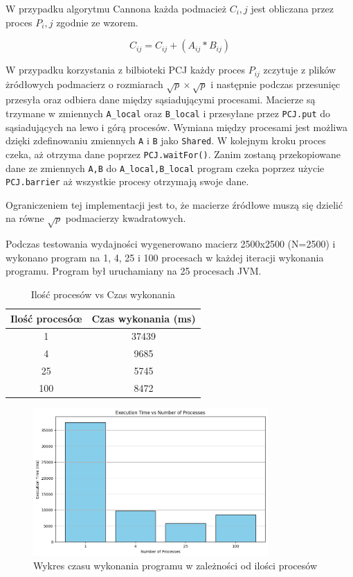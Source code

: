 \documentclass[11pt]{article}
\begin{document}
    W przypadku algorytmu Cannona każda podmacież $C_i,j$ jest obliczana przez proces $P_i,j$ zgodnie ze wzorem.

    \[C_{ij} = C_{ij} + (A_{ij} * B_{ij})\]

    W przypadku korzystania z bilbioteki PCJ każdy proces $P_{ij}$ zczytuje z plików żródłowych podmacierz o rozmiarach $\sqrt{p}\times\sqrt{p}$
    i następnie podczas przesunięc przesyła oraz odbiera dane między sąsiadującymi procesami. Macierze są trzymane w zmiennych \verb|A_local| oraz \verb|B_local|
    i przesyłane przez \verb|PCJ.put| do sąsiadujących na lewo i górą procesów. Wymiana między procesami jest możliwa dzięki zdefinowaniu zmiennych \verb|A| i \verb|B|
    jako \verb|Shared|. W kolejnym kroku proces czeka, aż otrzyma dane poprzez \verb|PCJ.waitFor()|. Zanim zostaną przekopiowane dane ze zmiennych \verb|A,B| do
    \verb|A_local,B_local| program czeka poprzez użycie \verb|PCJ.barrier| aż wszystkie procesy otrzymają swoje dane.

    Ograniczeniem tej implementacji jest to, że macierze źródłowe muszą się dzielić na równe $\sqrt{p}$ podmacierzy kwadratowych.

    Podczas testowania wydajności wygenerowano macierz 2500x2500 (N=2500) i wykonano program na 1, 4, 25 i 100 procesach
    w każdej iteracji wykonania programu. Program był uruchamiany na 25 procesach JVM.

    \begin{table}[h]
        \centering
        \begin{tabular}{|c|c|}
            \hline
            \textbf{Ilość procesóœ} & \textbf{Czas wykonania (ms)} \\
            \hline
            1  & 37439 \\
            4  & 9685 \\
            25  & 5745 \\
            100  & 8472 \\
            \hline
        \end{tabular}
        \caption{Ilość procesów vs Czas wykonania}
    \end{table}

    \begin{figure}
        \centering
        \includegraphics[width=0.8\textwidth]{pcj-plot.png}
        \caption{Wykres czasu wykonania programu w zależności od ilości procesów}
    \end{figure}
\end{document}
